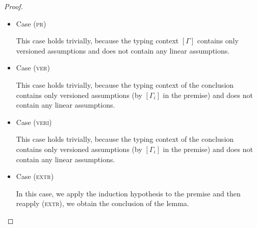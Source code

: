\begin{proof}
\begin{itemize}
\item Case (\textsc{pr})
\begin{center}
    \begin{minipage}{.4\linewidth}
    \end{minipage}
\end{center}
This case holds trivially, because the typing context $[\Gamma]$ contains only versioned assumptions and does not contain any linear assumptions.
\\

\item Case (\textsc{ver})
\begin{center}
    \begin{minipage}{.65\linewidth}
    \end{minipage}
\end{center}
This case holds trivially, because the typing context of the conclusion contains only versioned assumptions (by $[\Gamma_i]$ in the premise) and does not contain any linear assumptions.
\\

\item Case (\textsc{veri})
\begin{center}
    \begin{minipage}{.65\linewidth}
    \end{minipage}
\end{center}
This case holds trivially, because the typing context of the conclusion contains only versioned assumptions (by $[\Gamma_i]$ in the premise) and does not contain any linear assumptions.
\\

\item Case (\textsc{extr})
\begin{center}
    \begin{minipage}{.45\linewidth}
    \end{minipage}
\end{center}
In this case, we apply the induction hypothesis to the premise and then reapply (\textsc{extr}), we obtain the conclusion of the lemma.\\


\end{itemize}
\end{proof}
